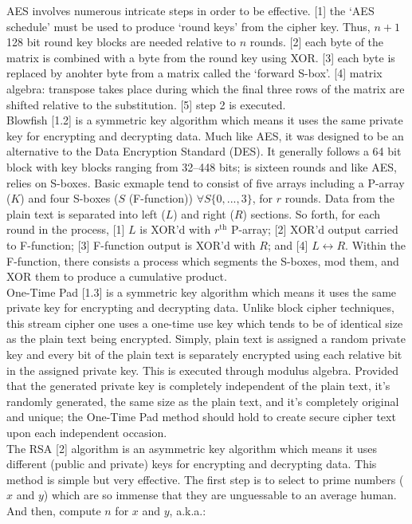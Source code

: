 \documentclass[11pt, english]{article}
\begin{document}
	AES involves numerous intricate steps in order to be effective. [1] the `AES schedule' must be used to produce `round keys' from the cipher key. Thus, $n+1$ 128 bit round key blocks are needed relative to $n$ rounds. [2] each byte of the matrix is combined with a byte from the round key using XOR. [3] each byte is replaced by anohter byte from a matrix called the `forward S-box'. [4] matrix algebra: transpose takes place during which the final three rows of the matrix are shifted relative to the substitution. [5] step 2 is executed.\\

	Blowfish [1.2] is a symmetric key algorithm which means it uses the same private key for encrypting and decrypting data. Much like AES, it was designed to be an alternative to the Data Encryption Standard (DES). It generally follows a 64 bit block with key blocks ranging from 32--448 bits; is sixteen rounds and like AES, relies on S-boxes. Basic exmaple tend to consist of five arrays including a P-array ($K$) and four S-boxes ($S$ (F-function)) $\forall S\{0,...,3\}$, for $r$ rounds. Data from the plain text is separated into left ($L$) and right ($R$) sections. So forth, for each round in the process, [1] $L$ is XOR'd with $r^{\mathrm{th}}$ P-array; [2] XOR'd output carried to F-function; [3] F-function output is XOR'd with $R$; and [4] $L\leftrightarrow R$. Within the F-function, there consists a process which segments the S-boxes, mod them, and XOR them to produce a cumulative product.\\

	One-Time Pad [1.3] is a symmetric key algorithm which means it uses the same private key for encrypting and decrypting data. Unlike block cipher techniques, this stream cipher one uses a one-time use key which tends to be of identical size as the plain text being encrypted. Simply, plain text is assigned a random private key and every bit of the plain text is separately encrypted using each relative bit in the assigned private key. This is executed through modulus algebra. Provided that the generated private key is completely independent of the plain text, it's randomly generated, the same size as the plain text, and it's completely original and unique; the One-Time Pad method should hold to create secure cipher text upon each independent occasion.\\

	The RSA [2] algorithm is an asymmetric key algorithm which means it uses different (public and private) keys for encrypting and decrypting data. This method is simple but very effective. The first step is to select to prime numbers ($x$ and $y$) which are so immense that they are unguessable to an average human. And then, compute $n$ for $x$ and $y$, a.k.a.:
\end{document}
